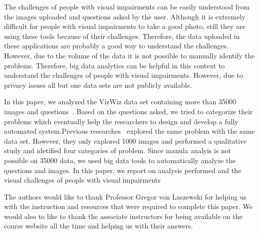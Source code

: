\documentclass[sigconf]{acmart}
\begin{document}
The challenges of people with visual impairments can be easily understood from the images uploaded and questions asked by the user. Although it is extremely difficult for people with visual impairments to take a good photo, still they are using these tools because of their challenges. Therefore, the data uploaded in these applications are probably a good way to understand the challenges. However, due to the volume of the data it is not possible to manually identify the problems. Therefore, big data analytics can be helpful in this context to understand the challenges of people with visual impairments. However, due to privacy issues all but one data sets are not publicly available. 

In this paper, we analyzed the VizWiz data set containing more than 35000 images and questions~\cite{Bigham:2010}. Based on the questions asked, we tried to categorize their problems which eventually help the researchers to design and develop a fully automated system.Previous researches~\cite{Brady:2013} explored the same problem with the same data set. However, they only explored 1000 images and performed a qualitative study and idetified four categories of problem. Since manula analyis is not possible on 35000 data, we used big data tools to automatically analyze the questions and images. In this paper, we report on analysis performed and the visual challenges of people with visual impairments


\begin{acks}

The authors would like to thank Professor Gregor von Laszewski for helping us with the instruction and resources that were required to complete this paper. We would also to like to thank the associate instructors for being available on the course website all the time and helping us with their answers.

\end{acks}




 
\newpage
\appendix




\end{document}
